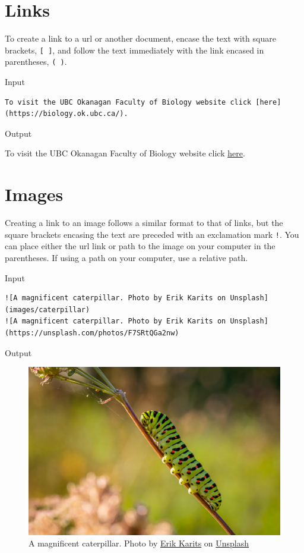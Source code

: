 \documentclass[
]{book}
\begin{document}
\hypertarget{links}{%
\section{Links}\label{links}}

To create a link to a url or another document, encase the text with square brackets, \texttt{{[}\ {]}}, and follow the text immediately with the link encased in parentheses, \texttt{(\ )}.

Input

\begin{verbatim}
To visit the UBC Okanagan Faculty of Biology website click [here](https://biology.ok.ubc.ca/).
\end{verbatim}

Output

To visit the UBC Okanagan Faculty of Biology website click \href{https://biology.ok.ubc.ca/}{here}.

\hypertarget{images}{%
\section{Images}\label{images}}

Creating a link to an image follows a similar format to that of links, but the square brackets encasing the text are preceded with an exclamation mark \texttt{!}. You can place either the url link or path to the image on your computer in the parentheses. If using a path on your computer, use a relative path.

Input

\begin{verbatim}
![A magnificent caterpillar. Photo by Erik Karits on Unsplash](images/caterpillar)
![A magnificent caterpillar. Photo by Erik Karits on Unsplash](https://unsplash.com/photos/F7SRtQGa2nw)
\end{verbatim}

Output

\begin{figure}
\centering
\includegraphics{images/MD_Caterpillar.jpg}
\caption{A magnificent caterpillar. Photo by \href{https://unsplash.com/@erik_karits?utm_source=unsplash\&utm_medium=referral\&utm_content=creditCopyText}{Erik Karits} on \href{https://unsplash.com/?utm_source=unsplash\&utm_medium=referral\&utm_content=creditCopyText}{Unsplash}}
\end{figure}
\end{document}
